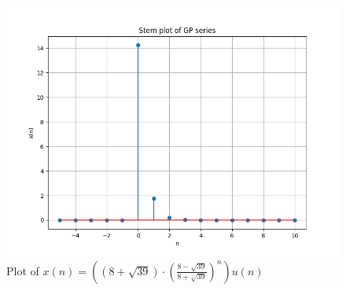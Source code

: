 \documentclass[journal,12pt,twocolumn]{IEEEtran}
\providecommand{\brak}[1]{\ensuremath{\left(#1\right)}}
\theoremstyle{remark}
\begin{document}
\begin{figure}[h!]
    \centering
    \includegraphics[width=\columnwidth]{ncert-maths/11/9/3/32/figs/gp.png}
    \caption{Plot of $x\brak{n} = \brak{\brak{8+\sqrt{39}}\cdot {\brak{\frac{8-\sqrt{39}}{8+\sqrt{39}}}}^{n}}u\brak{n}$}
    \label{fig: nik3}
\end{figure}

\end{document}
